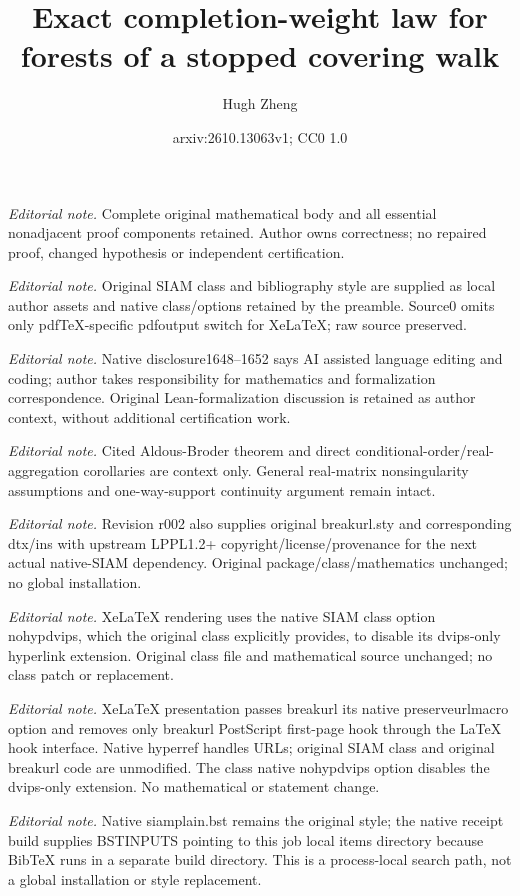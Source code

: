 \documentclass[onefignum,onetabnum,nohypdvips]{siamart250211}
\title{Exact completion-weight law for forests of a stopped covering walk}
\author{Hugh Zheng}
\date{arxiv:2610.13063v1; CC0 1.0}
\numberwithin{theorem}{section}
\numberwithin{equation}{section}
\begin{document}
\maketitle
\noindent\textit{Editorial note.} Complete original mathematical body and all essential nonadjacent proof components retained. Author owns correctness; no repaired proof, changed hypothesis or independent certification.\par\medskip
\noindent\textit{Editorial note.} Original SIAM class and bibliography style are supplied as local author assets and native class/options retained by the preamble. Source0 omits only pdfTeX-specific pdfoutput switch for XeLaTeX; raw source preserved.\par\medskip
\noindent\textit{Editorial note.} Native disclosure1648--1652 says AI assisted language editing and coding; author takes responsibility for mathematics and formalization correspondence. Original Lean-formalization discussion is retained as author context, without additional certification work.\par\medskip
\noindent\textit{Editorial note.} Cited Aldous-Broder theorem and direct conditional-order/real-aggregation corollaries are context only. General real-matrix nonsingularity assumptions and one-way-support continuity argument remain intact.\par\medskip
\noindent\textit{Editorial note.} Revision r002 also supplies original breakurl.sty and corresponding dtx/ins with upstream LPPL1.2+ copyright/license/provenance for the next actual native-SIAM dependency. Original package/class/mathematics unchanged; no global installation.\par\medskip
\noindent\textit{Editorial note.} XeLaTeX rendering uses the native SIAM class option nohypdvips, which the original class explicitly provides, to disable its dvips-only hyperlink extension. Original class file and mathematical source unchanged; no class patch or replacement.\par\medskip
\noindent\textit{Editorial note.} XeLaTeX presentation passes breakurl its native preserveurlmacro option and removes only breakurl PostScript first-page hook through the LaTeX hook interface. Native hyperref handles URLs; original SIAM class and original breakurl code are unmodified. The class native nohypdvips option disables the dvips-only extension. No mathematical or statement change.\par\medskip
\noindent\textit{Editorial note.} Native siamplain.bst remains the original style; the native receipt build supplies BSTINPUTS pointing to this job local items directory because BibTeX runs in a separate build directory. This is a process-local search path, not a global installation or style replacement.\par\medskip
\end{document}
